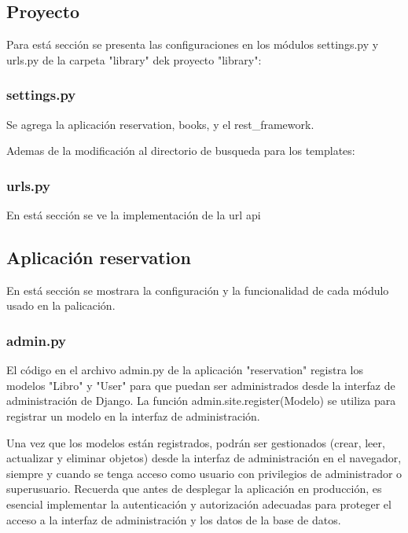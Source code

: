 \documentclass{article}
\begin{document}
	\subsection{Proyecto}
	
	Para está sección se presenta las configuraciones en los módulos settings.py y urls.py de la carpeta "library" dek proyecto "library":
	
	\subsubsection{settings.py}
	
	Se agrega la aplicación reservation, books, y el rest\_framework.
	
	
	
	Ademas de la modificación al directorio de busqueda para los templates:

	
	

	\subsubsection{urls.py}
	
	En está sección se ve la implementación de la url api
	
	
	
	
	\subsection{Aplicación reservation}
	
	En está sección se mostrara la configuración y la funcionalidad de cada módulo usado en la palicación.
	
	\subsubsection{admin.py}
	
	El código en el archivo admin.py de la aplicación "reservation" registra los modelos "Libro" y "User" para que puedan ser administrados desde la interfaz de administración de Django. La función 
	admin.site.register(Modelo) se utiliza para registrar un modelo en la interfaz de administración.
	
	Una vez que los modelos están registrados, podrán ser gestionados (crear, leer, actualizar y eliminar objetos) desde la interfaz de administración en el navegador, siempre y cuando se tenga acceso como usuario con privilegios de administrador o superusuario. Recuerda que antes de desplegar la aplicación en producción, es esencial implementar la autenticación y autorización adecuadas para proteger el acceso a la interfaz de administración y los datos de la base de datos.
	
\end{document}
